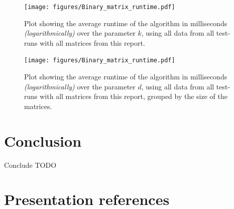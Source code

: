 \documentclass{beamer}
\begin{document}
\begin{frame}
  \begin{figure}
    \centering
    \texttt{[image: figures/Binary\_matrix\_runtime.pdf]}
    \caption{Plot showing the average runtime of the algorithm in milliseconds \textit{(logarithmically)}
      over the parameter $k$, using all data from all test-runs with all matrices from this report.}
  \end{figure}
\end{frame}

\begin{frame}
  \begin{figure}
    \centering
    \texttt{[image: figures/Binary\_matrix\_runtime.pdf]}
    \caption{Plot showing the average runtime of the algorithm in milliseconds \textit{(logarithmically)}
      over the parameter $d$, using all data from all test-runs with all matrices from this report, grouped by
      the size of the matrices.}
  \end{figure}
\end{frame}

\section{Conclusion}
\begin{frame}
  Conclude TODO
\end{frame}

\section{Presentation references}

\end{document}
